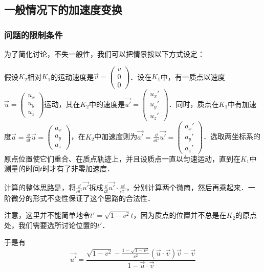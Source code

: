 

\subsection{一般情况下的加速度变换}
\subsubsection{问题的限制条件}

为了简化讨论，不失一般性，我们可以把情景按以下方式设定：

假设$K_2$相对$K_1$的运动速度是$\vec{v}=\left(\begin{matrix}v\\0\\0\end{matrix} \right) $．设在$K_1$中，有一质点以速度$\vec{u}=\left(\begin{matrix}u_x\\u_y\\u_z\end{matrix} \right)$运动，其在$K_2$中的速度是$\vec{u'}=\left(\begin{matrix}u_x'\\u_y'\\u_z'\end{matrix} \right) $．同时，质点在$K_1$中有加速度$\vec{a}=\frac{\dd}{\dd{t}}\vec{u}=\left(\begin{matrix}a_x\\a_y\\a_z\end{matrix} \right)$，在$K_2$中加速度则为$\vec{a'}=\frac{\dd}{\dd{t'}}\vec{u'}=\left(\begin{matrix}a_x'\\a_y'\\a_z'\end{matrix} \right)$．选取两坐标系的原点位置使它们重合、在质点轨迹上，并且设质点一直以匀速运动，直到在$K_1$中测量的时间$t$时才有了非零加速度．

计算的整体思路是，将$\frac{\dd}{\dd{t'}}\vec{u'}$拆成$\frac{\dd}{\dd{t}}\vec{u'}\cdot\frac{\dd{t}}{\dd{t'}}$，分别计算两个微商，然后再乘起来．一阶微分的形式不变性保证了这个思路的合法性．

注意，这里并不能简单地令$t'=\sqrt{1-v^2}t$，因为质点的位置并不总是在$K_2$的原点处，我们需要选所讨论位置的$t'$．

于是有
\begin{equation}\label{SRAcc_eq2}
\vec{u'}=\frac{\sqrt{1-v^2}-\frac{1-\sqrt{1-v^2}}{v^2}(\vec{u}\cdot\vec{v})\vec{v}-\vec{v}}{1-\vec{u}\cdot\vec{v}}
\end{equation}

